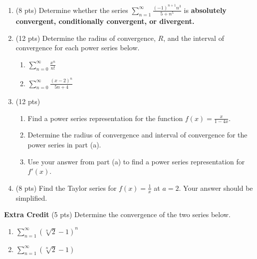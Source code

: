 \documentclass[12pt]{article}
\let\ds\displaystyle
\begin{document}
\begin{enumerate}
\begin{enumerate}
	\vfill

	\item $\ds \sum_{n=1}^{\infty} \frac{n^7}{2^n} $

	\vfill
\newpage	
	\item $\ds \sum_{n=1}^{\infty} (-1)^{n+1} \frac{1}{\sqrt[3]{n+3}}$ 

	\vfill
	\end{enumerate}

\item (8 pts) Determine whether the series $\ds \sum_{n=1}^{\infty}  \frac{(-1)^{n+1}n^3}{5+n^5}$ is \textbf{absolutely convergent, conditionally convergent, or divergent.}
\vfill

\vfill




\newpage
\item (12 pts) Determine the radius of convergence, $R$, and the interval of convergence for each power series below.
	\begin{enumerate}
	\item  $\ds \sum_{n=0}^\infty \frac{x^n}{n!}$
	\vfill
	\item  $\ds \sum_{n=0}^\infty \frac{(x-2)^n}{5n+4}$
	\vfill
	\vfill
	\end{enumerate}
\newpage
\item (12 pts)
	\begin{enumerate}
	\item Find a power series representation for the function $\ds f(x)=\frac{x}{1-4x}.$
	\vfill
	\item Determine the radius of convergence and interval of convergence for the power series in part (a).
	\vfill
	\item Use your answer from part (a) to find a power series representation for $f'(x).$ 
	\vfill
	\end{enumerate}
\newpage
\item (8 pts) Find the Taylor series for $f(x)=\frac{1}{x}$ at $a=2.$ Your answer should be simplified.
	\vfill
	\vfill

\end{enumerate}

\textbf{Extra Credit} (5 pts) Determine the convergence of the two series below.
	\begin{enumerate}
	\item[a.]  $\ds \sum_{n=1}^\infty (\sqrt[n]{2} -1)^n$
	\vfill
	\item[b.]  $\ds \sum_{n=1}^\infty (\sqrt[n]{2} -1)$
	\vfill
	\end{enumerate}
\end{document}
